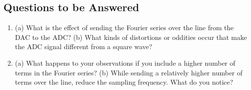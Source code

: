 \documentclass{article}
\begin{document}
\subsection{Questions to be Answered}

\begin{enumerate}
\item (a) What is the effect of sending the Fourier series over the line from the DAC to the ADC? (b) What kinds of distortions or oddities occur that make the ADC signal different from a square wave? \\ \vspace{3cm}
\item (a) What happens to your observations if you include a higher number of terms in the Fourier series? (b) While sending a relatively higher number of terms over the line, reduce the sampling frequency.  What do you notice?
\end{enumerate}
\end{document}
